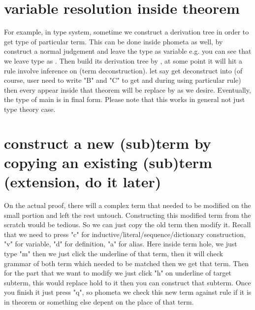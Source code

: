 \section{variable resolution inside theorem}

For example, in type system, sometime we construct a derivation tree in order to get type of particular term. This can be done inside phometa as well, by construct a normal judgement and leave the type as variable e.g.  you can see that we leave type as . Then build its derivation tree by \kTheorem, at some point it will hit a rule involve inference on  (term deconstruction). let say  get deconstruct into  (of course, user need to write "B" and "C" to get  and  during using particular rule) then every  appear inside that theorem will be replace by  as we desire. Eventually, the type of main is in final form. Please note that this works in general not just type theory case.

\section{construct a new (sub)term by copying an existing (sub)term (extension, do it later)}

On the actual proof, there will a complex term that needed to be modified on the small portion and left the rest untouch. Constructing this modified term from the scratch would be tedious. So we can just copy the old term then modify it. Recall that we need to press "c" for inductive/literal/sequence/dictionary construction, "v" for variable, "d" for definition, "a" for alias. Here inside term hole, we just type "m" then we just click the underline of that term, then it will check grammar of both term which needed to be matched then we get that term. Then for the part that we want to modify we just click "h" on underline of target subterm, this would replace hold to it then you can construct that subterm. Once you finish it just press "q", so phometa we check this new term against rule if it is in theorem or something else depent on the place of that term.
